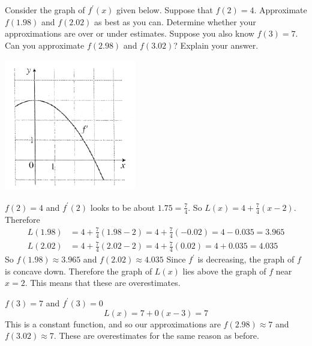 \documentclass[nooutcomes,handout]{ximera}
\begin{document}
\begin{problem}

  Consider the graph of $f^\prime (x)$ given below.
  Suppose that $f(2) = 4$.
  Approximate $f(1.98)$ and $f(2.02)$ as best as you can.
  Determine whether your approximations are over or under estimates.
  Suppose you also know $f(3) = 7$.
  Can you approximate $f(2.98)$ and $f(3.02)$?
  Explain your answer.
  \begin{center}
    \begin{image}
      \includegraphics{Figure1.png}
    \end{image}
  \end{center}
  \begin{freeResponse}
    $f(2) = 4$ and $f^\prime (2)$ looks to be about $1.75 = \frac{7}{4}$.
    So $L(x) = 4 + \frac{7}{4} (x-2)$.
    Therefore
    \begin{align*}
      L(1.98) &= 4 + \frac{7}{4} (1.98-2) = 4 + \frac{7}{4} (-0.02) = 4-0.035 = 3.965 \\
      L(2.02) &= 4 + \frac{7}{4} (2.02-2) = 4 + \frac{7}{4} (0.02) = 4+0.035 = 4.035
    \end{align*}
    So $f(1.98)\approx 3.965$ and $f(2.02)\approx 4.035$ 
    Since $f^\prime$ is decreasing, the graph of $f$ is concave down.
    Therefore the graph of $L(x)$ lies above the graph of $f$ near $x=2$.
    This means that these are overestimates.

    $f(3)=7$ and $f^\prime (3)=0$ 
    $$ L(x) =7+0(x-3) = 7$$
    This is a constant function, and so our approximations are $f(2.98)\approx 7$ and $f(3.02)\approx 7$.
    These are overestimates for the same reason as before.
  \end{freeResponse}
\end{problem}
\end{document}
